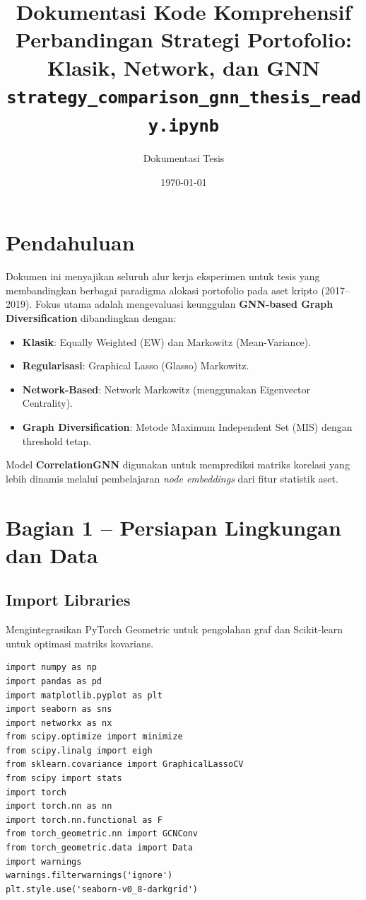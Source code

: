 \documentclass[12pt,a4paper]{article}
\title{\textbf{Dokumentasi Kode Komprehensif} \\ \large Perbandingan Strategi Portofolio: Klasik, Network, dan GNN \\
\small \texttt{strategy\_comparison\_gnn\_thesis\_ready.ipynb}}
\author{Dokumentasi Tesis}
\date{\today}
\begin{document}
\maketitle
\tableofcontents
\newpage

\section{Pendahuluan}
Dokumen ini menyajikan seluruh alur kerja eksperimen untuk tesis yang membandingkan berbagai paradigma alokasi portofolio pada aset kripto (2017--2019). Fokus utama adalah mengevaluasi keunggulan \textbf{GNN-based Graph Diversification} dibandingkan dengan:
\begin{itemize}
    \item \textbf{Klasik}: Equally Weighted (EW) dan Markowitz (Mean-Variance).
    \item \textbf{Regularisasi}: Graphical Lasso (Glasso) Markowitz.
    \item \textbf{Network-Based}: Network Markowitz (menggunakan Eigenvector Centrality).
    \item \textbf{Graph Diversification}: Metode Maximum Independent Set (MIS) dengan threshold tetap.
\end{itemize}

Model \textbf{CorrelationGNN} digunakan untuk memprediksi matriks korelasi yang lebih dinamis melalui pembelajaran \textit{node embeddings} dari fitur statistik aset.

\section{Bagian 1 -- Persiapan Lingkungan dan Data}

\subsection{Import Libraries}
Mengintegrasikan PyTorch Geometric untuk pengolahan graf dan Scikit-learn untuk optimasi matriks kovarians.
\begin{lstlisting}[caption={Import pustaka yang diperlukan}]
import numpy as np
import pandas as pd
import matplotlib.pyplot as plt
import seaborn as sns
import networkx as nx
from scipy.optimize import minimize
from scipy.linalg import eigh
from sklearn.covariance import GraphicalLassoCV
from scipy import stats
import torch
import torch.nn as nn
import torch.nn.functional as F
from torch_geometric.nn import GCNConv
from torch_geometric.data import Data
import warnings
warnings.filterwarnings('ignore')
plt.style.use('seaborn-v0_8-darkgrid')
\end{lstlisting}
\end{document}
